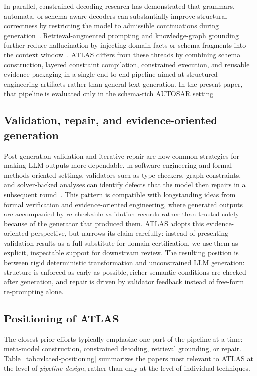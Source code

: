 \documentclass[acmlarge,nonacm]{acmart}
\theoremstyle{acmplain}
\theoremstyle{acmdefinition}
\begin{document}
In parallel, constrained decoding research has demonstrated that grammars, automata, or schema-aware decoders can substantially improve structural correctness by restricting the model to admissible continuations during generation~\cite{scholakPICARDParsingIncrementally2021,poesiaSynchromeshReliableCode2021,gengGrammarConstrainedDecodingStructured2024,Dong2024XGrammar,Park2025,Nguyen2026UnifiedDecoding}. Retrieval-augmented prompting and knowledge-graph grounding further reduce hallucination by injecting domain facts or schema fragments into the context window~\cite{zhangKnowGPTKnowledgeGraph2024}. ATLAS differs from these threads by combining schema construction, layered constraint compilation, constrained execution, and reusable evidence packaging in a single end-to-end pipeline aimed at structured engineering artifacts rather than general text generation. In the present paper, that pipeline is evaluated only in the schema-rich AUTOSAR setting.

\subsection{Validation, repair, and evidence-oriented generation}
Post-generation validation and iterative repair are now common strategies for making LLM outputs more dependable. In software engineering and formal-methods-oriented settings, validators such as type checkers, graph constraints, and solver-backed analyses can identify defects that the model then repairs in a subsequent round~\cite{tangCodeRepairLLMs2024,shinn2023reflexion,chen2024selfdebug}. This pattern is compatible with longstanding ideas from formal verification and evidence-oriented engineering, where generated outputs are accompanied by re-checkable validation records rather than trusted solely because of the generator that produced them. ATLAS adopts this evidence-oriented perspective, but narrows its claim carefully: instead of presenting validation results as a full substitute for domain certification, we use them as explicit, inspectable support for downstream review. The resulting position is between rigid deterministic transformation and unconstrained LLM generation: structure is enforced as early as possible, richer semantic conditions are checked after generation, and repair is driven by validator feedback instead of free-form re-prompting alone.

\subsection{Positioning of ATLAS}
The closest prior efforts typically emphasize one part of the pipeline at a time: meta-model construction, constrained decoding, retrieval grounding, or repair. Table~\ref{tab:related-positioning} summarizes the papers most relevant to ATLAS at the level of \emph{pipeline design}, rather than only at the level of individual techniques.
\end{document}
